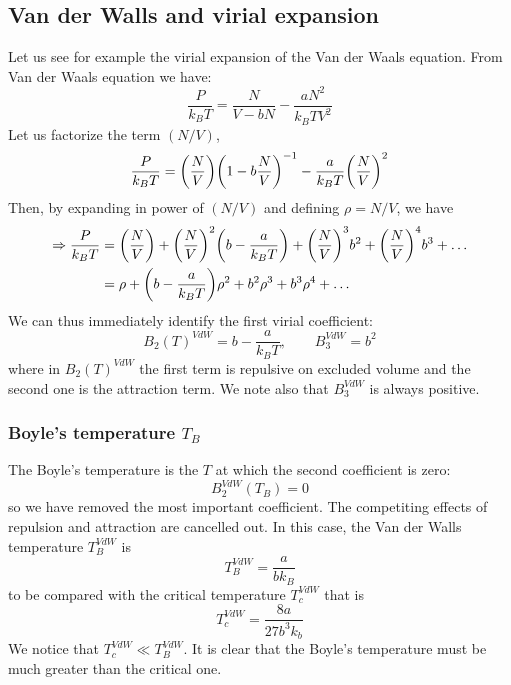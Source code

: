 \documentclass[../../Main/Main.tex]{subfiles}
\begin{document}
\subsection{Van der Walls and virial expansion}
Let us see for example the virial expansion of the Van der Waals equation. From Van der Waals equation we have:
\begin{equation*}
  \frac{P}{k_B T} = \frac{N}{V-bN} - \frac{a N^2}{k_B T V^2}
\end{equation*}
Let us factorize the term \( (N/V) \),
\begin{equation*}
  \frac{P}{k_B T} = \qty(\frac{N}{V}) \qty(1 - b \frac{N}{V})^{-1} - \frac{a}{k_B T}\qty(\frac{N}{V})^2
\end{equation*}
Then, by expanding in power of \( (N/V) \) and defining \( \rho = N/V \), we have
\begin{equation*}
\begin{split}
  \Rightarrow \frac{P}{k_B T}  &= \qty(\frac{N}{V}) + \qty(\frac{N}{V})^2 \qty(b - \frac{a}{k_B T}) + \qty(\frac{N}{V})^3 b^2 + \qty(\frac{N}{V})^4 b^3 + \dots \\
  & = \rho + \qty(b - \frac{a}{k_B T})\rho ^2 + b^2 \rho ^3 + b^3 \rho ^4 + \dots
\end{split}
\end{equation*}
We can thus immediately identify the first virial coefficient:
\begin{equation*}
  B_2 (T)^{VdW} = b - \frac{a}{k_B T}, \qquad B_3^{VdW} = b^2
\end{equation*}
where in \( B_2 (T)^{VdW}  \) the first term is repulsive on excluded volume and the second one is the attraction term. We note also that \( B_3^{VdW} \) is always positive.

\subsubsection{Boyle's temperature \( T_B \) }
The Boyle's temperature is the \( T \) at which the second coefficient is zero:
\begin{equation*}
  B_2^{VdW} (T_B) = 0
\end{equation*}
so we have removed the most important coefficient. The competiting effects of repulsion and attraction are cancelled out. In this case, the Van der Walls temperature \( T_B^{VdW} \) is
\begin{equation*}
  T_B^{VdW} = \frac{a}{b k_B}
\end{equation*}
to be compared with the critical temperature \( T_c^{VdW} \) that is
\begin{equation*}
  T_c^{VdW} = \frac{8 a}{27 b^3 k_b}
\end{equation*}
We notice that \( T_c^{VdW} \ll T_B ^{VdW} \).  It is clear that the Boyle's temperature must be much greater than the critical one.
\end{document}
